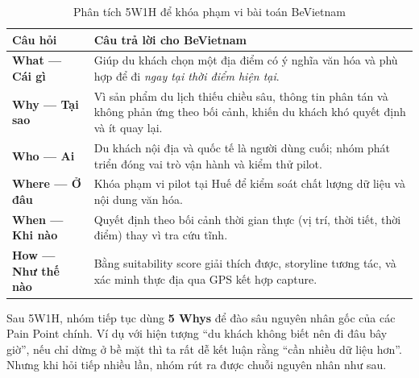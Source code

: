 \begin{table}[H]
\centering
\caption{Phân tích 5W1H để khóa phạm vi bài toán BeVietnam}
\label{tab:5w1h}
\begin{tabularx}{\textwidth}{>{\raggedright\arraybackslash}p{2.7cm} X}
\toprule
\textbf{Câu hỏi} & \textbf{Câu trả lời cho BeVietnam} \\
\midrule
\textbf{What --- Cái gì} & Giúp du khách chọn một địa điểm có ý nghĩa văn hóa và phù hợp để đi \textit{ngay tại thời điểm hiện tại}. \\
\textbf{Why --- Tại sao} & Vì sản phẩm du lịch thiếu chiều sâu, thông tin phân tán và không phản ứng theo bối cảnh, khiến du khách khó quyết định và ít quay lại. \\
\textbf{Who --- Ai} & Du khách nội địa và quốc tế là người dùng cuối; nhóm phát triển đóng vai trò vận hành và kiểm thử pilot. \\
\textbf{Where --- Ở đâu} & Khóa phạm vi pilot tại Huế để kiểm soát chất lượng dữ liệu và nội dung văn hóa. \\
\textbf{When --- Khi nào} & Quyết định theo bối cảnh thời gian thực (vị trí, thời tiết, thời điểm) thay vì tra cứu tĩnh. \\
\textbf{How --- Như thế nào} & Bằng suitability score giải thích được, storyline tương tác, và xác minh thực địa qua GPS kết hợp capture. \\
\bottomrule
\end{tabularx}
\end{table}

Sau 5W1H, nhóm tiếp tục dùng \textbf{5 Whys} để đào sâu nguyên nhân gốc
của các Pain Point chính. Ví dụ với hiện tượng ``du khách không biết nên
đi đâu bây giờ'', nếu chỉ dừng ở bề mặt thì ta rất dễ kết luận rằng
``cần nhiều dữ liệu hơn''. Nhưng khi hỏi tiếp nhiều lần, nhóm rút ra
được chuỗi nguyên nhân như sau.

